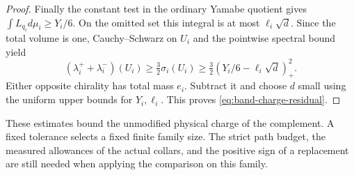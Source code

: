 \begin{proof}
Finally the constant test in the ordinary Yamabe quotient gives
\(\int L_{q_i}d\mu_i\ge Y_i/6\). On the omitted set this integral
is at most \(\ell_i\sqrt d\). Since the total volume is one,
Cauchy--Schwarz on \(U_i\) and the pointwise spectral bound yield
\[
 (\lambda_i^++\lambda_i^-)(U_i)
 \ge \tfrac32\sigma_i(U_i)
 \ge \tfrac32(Y_i/6-\ell_i\sqrt d)_+^2 .
\]
Either opposite chirality has total mass \(e_i\). Subtract it and
choose \(d\) small using the uniform upper bounds for \(Y_i,\ell_i\).
This proves \eqref{eq:band-charge-residual}.
\end{proof}

These estimates bound the unmodified physical charge of the
complement. A fixed tolerance selects a fixed finite family size.
The strict path budget, the measured allowances of the actual
collars, and the positive sign of a replacement are still needed
when applying the comparison on this family.
